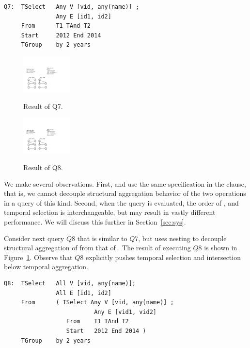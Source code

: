 \begin{verbatim}
Q7:  TSelect   Any V [vid, any(name)] ;
               Any E [id1, id2]
     From      T1 TAnd T2
     Start     2012 End 2014
     TGroup    by 2 years
\end{verbatim}

\begin{figure}
\centering
\begin{minipage}{1.6in}
  \centering
  \includegraphics[width=1in]{figs/q7.pdf}
  \caption{Result of Q7.}{}
  \label{fig:q7}
\end{minipage}%
\begin{minipage}{1.6in}
  \centering
  \includegraphics[width=1in]{figs/q8.pdf}
  \caption{Result of Q8.}{}
  \label{fig:q8}
\end{minipage}
\end{figure}

We make several observations.  First,  and 
use the same specification in the  clause, that is, we
cannot decouple structural aggregation behavior of the two operations
in a query of this kind. Second, when the query is evaluated, the
order of ,  and temporal selection is
interchangeable, but may result in vastly different performance.  We
will discuss this further in Section~\ref{sec:sys}.


Consider next query $Q8$ that is similar to $Q7$, but uses nesting to
decouple structural aggregation of  from that of
. The result of executing $Q8$ is shown in
Figure~\ref{fig:q8}.  Observe that $Q8$ explicitly pushes temporal
selection and intersection below temporal aggregation.

\begin{verbatim}
Q8:  TSelect   All V [vid, any{name)];
               All E [id1, id2]
     From      ( TSelect Any V [vid, any(name)] ; 
                          Any E [vid1, vid2]
                  From    T1 TAnd T2
                  Start   2012 End 2014 )
     TGroup    by 2 years
\end{verbatim}

